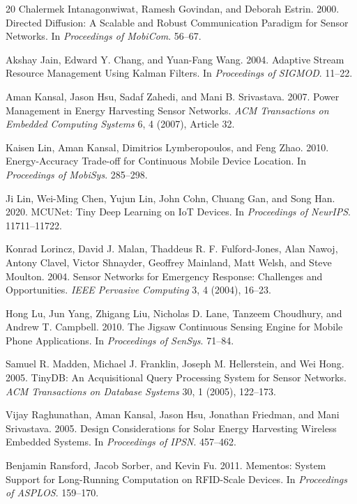\begin{thebibliography}{20}
Chalermek Intanagonwiwat, Ramesh Govindan, and Deborah Estrin.
2000.
Directed Diffusion: A Scalable and Robust Communication Paradigm for Sensor
Networks.
In \emph{Proceedings of MobiCom}. 56--67.

Akshay Jain, Edward Y. Chang, and Yuan-Fang Wang.
2004.
Adaptive Stream Resource Management Using Kalman Filters.
In \emph{Proceedings of SIGMOD}. 11--22.

Aman Kansal, Jason Hsu, Sadaf Zahedi, and Mani B. Srivastava.
2007.
Power Management in Energy Harvesting Sensor Networks.
\emph{ACM Transactions on Embedded Computing Systems} 6, 4 (2007), Article 32.

Kaisen Lin, Aman Kansal, Dimitrios Lymberopoulos, and Feng Zhao.
2010.
Energy-Accuracy Trade-off for Continuous Mobile Device Location.
In \emph{Proceedings of MobiSys}. 285--298.

Ji Lin, Wei-Ming Chen, Yujun Lin, John Cohn, Chuang Gan, and Song Han.
2020.
MCUNet: Tiny Deep Learning on IoT Devices.
In \emph{Proceedings of NeurIPS}. 11711--11722.

Konrad Lorincz, David J. Malan, Thaddeus R. F. Fulford-Jones, Alan Nawoj,
Antony Clavel, Victor Shnayder, Geoffrey Mainland, Matt Welsh, and Steve Moulton.
2004.
Sensor Networks for Emergency Response: Challenges and Opportunities.
\emph{IEEE Pervasive Computing} 3, 4 (2004), 16--23.

Hong Lu, Jun Yang, Zhigang Liu, Nicholas D. Lane, Tanzeem Choudhury, and
Andrew T. Campbell.
2010.
The Jigsaw Continuous Sensing Engine for Mobile Phone Applications.
In \emph{Proceedings of SenSys}. 71--84.

Samuel R. Madden, Michael J. Franklin, Joseph M. Hellerstein, and Wei Hong.
2005.
TinyDB: An Acquisitional Query Processing System for Sensor Networks.
\emph{ACM Transactions on Database Systems} 30, 1 (2005), 122--173.

Vijay Raghunathan, Aman Kansal, Jason Hsu, Jonathan Friedman, and Mani Srivastava.
2005.
Design Considerations for Solar Energy Harvesting Wireless Embedded Systems.
In \emph{Proceedings of IPSN}. 457--462.

Benjamin Ransford, Jacob Sorber, and Kevin Fu.
2011.
Mementos: System Support for Long-Running Computation on RFID-Scale Devices.
In \emph{Proceedings of ASPLOS}. 159--170.

\end{thebibliography}
